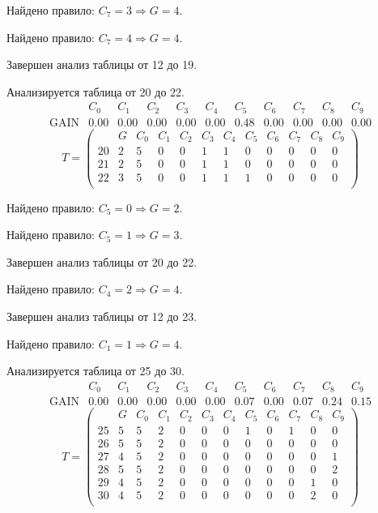 Найдено правило: $C_{7} = 3 \Longrightarrow G = 4$.

Найдено правило: $C_{7} = 4 \Longrightarrow G = 4$.

Завершен анализ таблицы от 12 до 19.

Анализируется таблица от 20 до 22.
$$ 
\begin{array}{lccccc|c|cccc}
	  & C_{0} & C_{1} & C_{2} & C_{3} & C_{4} & C_{5} & C_{6} & C_{7} & C_{8} & C_{9}\\
 \textrm{GAIN} & 0.00 & 0.00 & 0.00 & 0.00 & 0.00 & 0.48 & 0.00 & 0.00 & 0.00 & 0.00
\end{array}
 $$
$$
T = \left( \begin{array}{lcccccc|c|cccc}
	 & G & C_{0} & C_{1} & C_{2} & C_{3} & C_{4} & C_{5} & C_{6} & C_{7} & C_{8} & C_{9}\\
	20 & 2 & 5 & 0 & 0 & 1 & 1 & 0 & 0 & 0 & 0 & 0\\
	21 & 2 & 5 & 0 & 0 & 1 & 1 & 0 & 0 & 0 & 0 & 0\\
	22 & 3 & 5 & 0 & 0 & 1 & 1 & 1 & 0 & 0 & 0 & 0\\
\end{array} \right)
$$

Найдено правило: $C_{5} = 0 \Longrightarrow G = 2$.

Найдено правило: $C_{5} = 1 \Longrightarrow G = 3$.

Завершен анализ таблицы от 20 до 22.

Найдено правило: $C_{4} = 2 \Longrightarrow G = 4$.

Завершен анализ таблицы от 12 до 23.

Найдено правило: $C_{1} = 1 \Longrightarrow G = 4$.

Анализируется таблица от 25 до 30.
$$ 
\begin{array}{lcccccccc|c|c}
	  & C_{0} & C_{1} & C_{2} & C_{3} & C_{4} & C_{5} & C_{6} & C_{7} & C_{8} & C_{9}\\
 \textrm{GAIN} & 0.00 & 0.00 & 0.00 & 0.00 & 0.00 & 0.07 & 0.00 & 0.07 & 0.24 & 0.15
\end{array}
 $$
$$
T = \left( \begin{array}{lccccccccc|c|c}
	 & G & C_{0} & C_{1} & C_{2} & C_{3} & C_{4} & C_{5} & C_{6} & C_{7} & C_{8} & C_{9}\\
	25 & 5 & 5 & 2 & 0 & 0 & 0 & 1 & 0 & 1 & 0 & 0\\
	26 & 5 & 5 & 2 & 0 & 0 & 0 & 0 & 0 & 0 & 0 & 0\\
	27 & 4 & 5 & 2 & 0 & 0 & 0 & 0 & 0 & 0 & 0 & 1\\
	28 & 5 & 5 & 2 & 0 & 0 & 0 & 0 & 0 & 0 & 0 & 2\\
	29 & 4 & 5 & 2 & 0 & 0 & 0 & 0 & 0 & 0 & 1 & 0\\
	30 & 4 & 5 & 2 & 0 & 0 & 0 & 0 & 0 & 0 & 2 & 0\\
\end{array} \right)
$$

